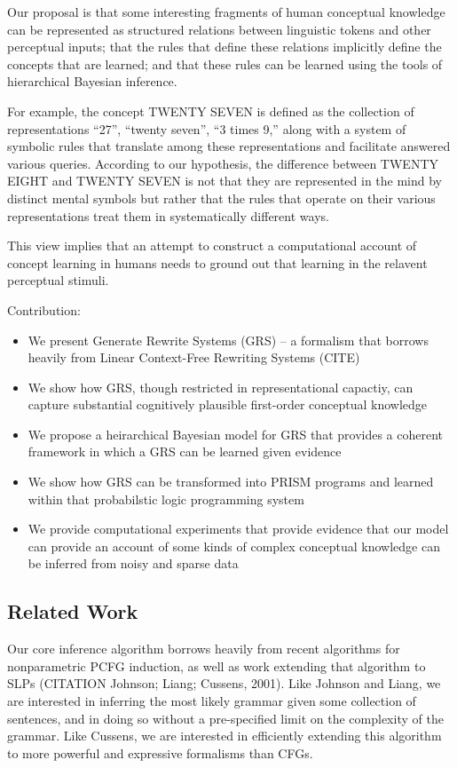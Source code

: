 \documentclass[11pt, twocolumn]{article}
\begin{document}
Our proposal is that some interesting fragments of human conceptual
knowledge can be represented as structured relations between
linguistic tokens and other perceptual inputs; that the rules that
define these relations implicitly define the concepts that are
learned; and that these rules can be learned using the tools of
hierarchical Bayesian inference. 

For example, the concept TWENTY SEVEN is defined as the collection of
representations ``27'', ``twenty seven'', ``3 times 9,'' along with a
system of symbolic rules that translate among these representations
and facilitate answered various queries. According to our hypothesis,
the difference between TWENTY EIGHT and TWENTY SEVEN is not that they
are represented in the mind by distinct mental symbols but rather that
the rules that operate on their various representations treat them in
systematically different ways.

This view implies that an attempt to construct a computational account
of concept learning in humans needs to ground out that learning in the
relavent perceptual stimuli. 

Contribution:
\begin{itemize}
\item We present Generate Rewrite Systems (GRS) -- a formalism that borrows
  heavily from Linear Context-Free Rewriting Systems (CITE)
\item We show how GRS, though restricted in representational capactiy,
  can capture substantial cognitively plausible first-order conceptual knowledge 
\item We propose a heirarchical Bayesian model for GRS that provides a coherent framework in which a GRS can be learned given evidence
\item We show how GRS can be transformed into PRISM programs and learned within that probabilstic logic programming system
\item We provide computational experiments that provide evidence that
  our model can provide an account of some kinds of complex conceptual
  knowledge can be inferred from noisy and sparse data
\end{itemize}

\subsection{Related Work}
Our core inference algorithm borrows heavily from recent algorithms for nonparametric PCFG induction, as well as work extending that algorithm to SLPs (CITATION Johnson; Liang; Cussens, 2001). Like Johnson and Liang, we are interested in inferring the most likely grammar given some collection of sentences, and in doing so without a pre-specified limit on the complexity of the grammar. Like Cussens, we are interested in efficiently extending this algorithm to more powerful and expressive formalisms than CFGs.
\end{document}
